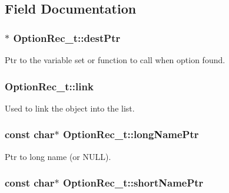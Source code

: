 \subsection{Field Documentation}
\subsubsection[{\texorpdfstring{dest\+Ptr}{destPtr}}]{$\ast$ Option\+Rec\+\_\+t\+::dest\+Ptr}\hypertarget{struct_option_rec__t_a8ed0f7e1979b02ae1385dd403a627b46}{}\label{struct_option_rec__t_a8ed0f7e1979b02ae1385dd403a627b46}


Ptr to the variable set or function to call when option found. 

\subsubsection[{\texorpdfstring{link}{link}}]{ Option\+Rec\+\_\+t\+::link}\hypertarget{struct_option_rec__t_a52b1985a530cfe362377c308235db48e}{}\label{struct_option_rec__t_a52b1985a530cfe362377c308235db48e}


Used to link the object into the list. 

\subsubsection[{\texorpdfstring{long\+Name\+Ptr}{longNamePtr}}]{\setlength{\rightskip}{0pt plus 5cm}const char$\ast$ Option\+Rec\+\_\+t\+::long\+Name\+Ptr}\hypertarget{struct_option_rec__t_aa234031bd4d05347d5e6a92d631bda3a}{}\label{struct_option_rec__t_aa234031bd4d05347d5e6a92d631bda3a}


Ptr to long name (or N\+U\+LL). 

\subsubsection[{\texorpdfstring{short\+Name\+Ptr}{shortNamePtr}}]{\setlength{\rightskip}{0pt plus 5cm}const char$\ast$ Option\+Rec\+\_\+t\+::short\+Name\+Ptr}\hypertarget{struct_option_rec__t_a36848bfbc10e1b2efc7bb55298bffbfe}{}\label{struct_option_rec__t_a36848bfbc10e1b2efc7bb55298bffbfe}


